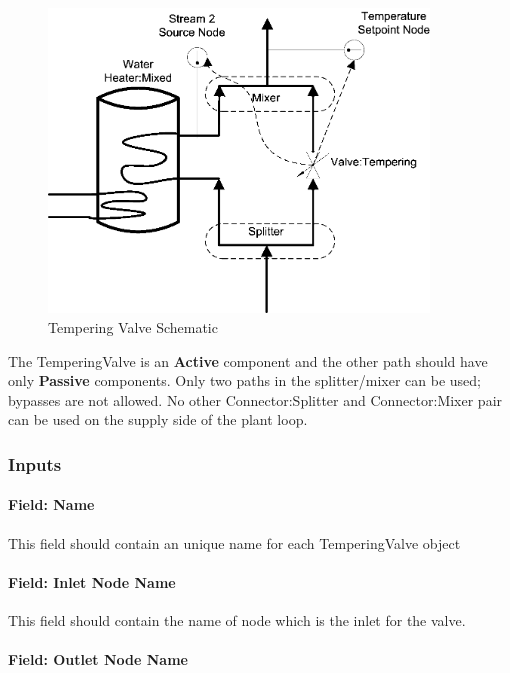 \begin{figure}[hbtp] %
\centering
\includegraphics[width=0.9\textwidth, height=0.9\textheight, keepaspectratio=true]{media/image208.png}
\caption{Tempering Valve Schematic \protect \label{fig:tempering-valve-schematic}}
\end{figure}

The TemperingValve is an \textbf{Active} component and the other path should have only \textbf{Passive} components. Only two paths in the splitter/mixer can be used; bypasses are not allowed. No other Connector:Splitter and Connector:Mixer pair can be used on the supply side of the plant loop.

\subsubsection{Inputs}\label{inputs-2-029}

\paragraph{Field: Name}\label{field-name-2-028}

This field should contain an unique name for each TemperingValve object

\paragraph{Field: Inlet Node Name}\label{field-inlet-node-name-003}

This field should contain the name of node which is the inlet for the valve.

\paragraph{Field: Outlet Node Name}\label{field-outlet-node-name-004}


